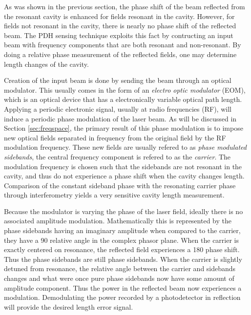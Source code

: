As was shown in the previous section, the phase shift of the beam reflected from the resonant cavity is enhanced for fields resonant in the cavity. %
However, for fields not resonant in the cavity, there is nearly no phase shift of the reflected beam. %
The PDH sensing technique exploits this fact by contructing an input beam with frequency components that are both resonant and non-resonant. %
By doing a relative phase measurement of the reflected fields, one may determine length changes of the cavity.

Creation of the input beam is done by sending the beam through an optical modulator. %
This usually comes in the form of an \emph{electro optic modulator} (EOM), which is an optical device that has a electronically variable optical path length. %
Applying a periodic electronic signal, usually at radio frequencies (RF), will induce a periodic phase modulation of the laser beam. %
As will be discussed in Section \ref{sec:freqspace}, the primary result of this phase modulation is to impose new optical fields separated in frequency from the original field by the RF modulation frequency. %
These new fields are usually refered to as \emph{phase modulated sidebands}, the central frequency component is refered to as the \emph{carrier}. The modulation frequency is chosen such that the sidebands are not resonant in the cavity, and thus do not experience a phase shift when the cavity changes length. %
Comparison of the constant sideband phase with the resonating carrier phase through interferometry yields a very sensitive cavity length measurement. %


Because the modulator is varying the phase of the laser field, ideally there is no associated amplitude modulation. %
Mathematically this is represented by the phase sidebands having an imaginary amplitude when compared to the carrier, they have a 90\degrees{} relative angle in the complex phasor plane. %
When the carrier is exactly centered on resonance, the reflected field experiences a 180\degrees{} phase shift. %
Thus the phase sidebands are still phase sidebands. %
When the carrier is slightly detuned from resonance, the relative angle between the carrier and sidebands changes and what were once pure phase sidebands now have some amount of amplitude component. %
Thus the power in the reflected beam now experiences a modulation. %
Demodulating the power recorded by a photodetector in reflection will provide the desired length error signal.

